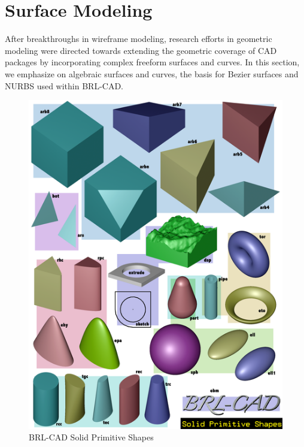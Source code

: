 
\section{Surface Modeling}

After breakthroughs in wireframe modeling, research efforts in geometric modeling were directed 
towards extending the geometric coverage of CAD packages by incorporating complex free­form surfaces
 and curves. In this section, we emphasize on algebraic surfaces and curves, the basis for Bezier 
surfaces and NURBS used within BRL­-CAD. 


\begin{figure}[htbp]
\centering
\includegraphics[trim=0.1cm 0.3cm 0.5cm 0.5cm, clip=true, totalheight=0.6\textheight]{Figures/Primitives.png}
\caption[BRL­-CAD Solid Primitive Shapes]{BRL-­CAD Solid Primitive Shapes}
\label{Primitives}
\end{figure}

